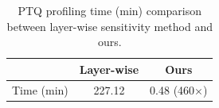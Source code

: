\begin{table}[htbp]
\centering
\captionsetup{font=small}
\caption{PTQ profiling time (min) comparison between layer-wise sensitivity method and ours.}
\begin{tabular}{lcc}
\toprule
 & Layer-wise & Ours \\
\midrule
Time (min) & 227.12 & 0.48 (460$\times$) \\
\bottomrule
\end{tabular}
\label{tab:quantmacvo:profiling_time}
\end{table}
